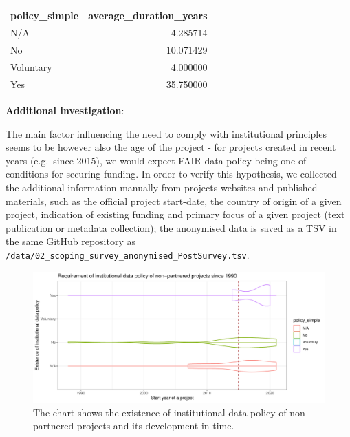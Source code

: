 \documentclass[
  12pt,
]{scrreprt}
\begin{document}
\begin{longtable}[]{@{}lr@{}}
\toprule
policy\_simple & average\_duration\_years \\
\midrule
\endhead
N/A & 4.285714 \\
No & 10.071429 \\
Voluntary & 4.000000 \\
Yes & 35.750000 \\
\bottomrule
\end{longtable}

\normalsize

\textbf{Additional investigation}:

The main factor influencing the need to comply with institutional
principles seems to be however also the age of the project - for
projects created in recent years (e.g.~since 2015), we would expect FAIR
data policy being one of conditions for securing funding. In order to
verify this hypothesis, we collected the additional information manually
from projects websites and published materials, such as the official
project start-date, the country of origin of a given project, indication
of existing funding and primary focus of a given project (text
publication or metadata collection); the anonymised data is saved as a
TSV in the same GitHub repository as
\texttt{/data/02\_scoping\_survey\_anonymised\_PostSurvey.tsv}.

\footnotesize

\normalsize

\footnotesize

\begin{figure}

{\centering \includegraphics{01_FAIR_epi_report_files/figure-latex/fig2-1} 

}

\caption{The chart shows the existence of institutional data policy of non-partnered projects and its development in time.}\label{fig:fig2}
\end{figure}
\end{document}
